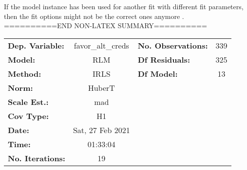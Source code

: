 If the model instance has been used for another fit with different fit parameters, then the fit options might not be the correct ones anymore .
==========END NON-LATEX SUMMARY==========
\begin{center}
\begin{tabular}{lclc}
\toprule
\textbf{Dep. Variable:}  & favor\_alt\_creds & \textbf{  No. Observations:  } &    339  \\
\textbf{Model:}          &        RLM        & \textbf{  Df Residuals:      } &    325  \\
\textbf{Method:}         &        IRLS       & \textbf{  Df Model:          } &     13  \\
\textbf{Norm:}           &       HuberT      & \textbf{                     } &         \\
\textbf{Scale Est.:}     &        mad        & \textbf{                     } &         \\
\textbf{Cov Type:}       &         H1        & \textbf{                     } &         \\
\textbf{Date:}           &  Sat, 27 Feb 2021 & \textbf{                     } &         \\
\textbf{Time:}           &      01:33:04     & \textbf{                     } &         \\
\textbf{No. Iterations:} &         19        & \textbf{                     } &         \\
\bottomrule
\end{tabular}
\end{center}
